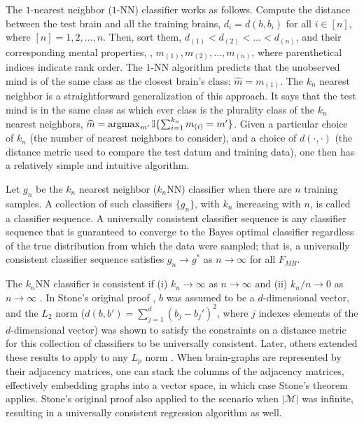\documentclass{article}
\newcommand{\conv}{\rightarrow}
\newcommand{\II}{\mathbb{I}}           %
\providecommand{\mc}[1]{\mathcal{#1}}
\providecommand{\mh}[1]{\widehat{#1}}
\newcommand{\argmax}{\operatornamewithlimits{argmax}}
\begin{document}
The $1$-nearest neighbor ($1$-NN) classifier works as follows.  Compute the distance between the test brain and all the training brains, $d_i=d(b,b_i)$ for all $i \in [n]$, where $[n]=1,2,\ldots, n$.  Then, sort them, $d_{(1)} < d_{(2)} < \ldots < d_{(n)}$, and their corresponding mental properties, , $m_{(1)}, m_{(2)}, \ldots, m_{(n)}$, where parenthetical indices indicate rank order.  %
The $1$-NN algorithm predicts that the unobserved mind is of the same class as the closest brain's class: $\mh{m}=m_{(1)}$.  The $k_n$ nearest neighbor is a straightforward generalization of this approach.  It says that the test mind is in the same class as which ever class is the plurality class of the $k_n$ nearest neighbors, $\mh{m}=\argmax_{m'}\II\{\sum_{i=1}^{k_n} m_{(i)}=m'\}$.  Given a particular choice of $k_n$ (the number of nearest neighbors to consider), and a choice of $d(\cdot,\cdot)$ (the distance metric used to compare the test datum and training data), one then has a relatively simple and intuitive algorithm.  

Let $g_n$ be the $k_n$ nearest neighbor ($k_n$NN) classifier when there are $n$ training samples.  
A collection of such classifiers $\{g_n\}$,  with $k_n$ increasing with $n$, is called a classifier sequence.  
A universally consistent classifier sequence is any classifier sequence that is guaranteed to converge to the Bayes optimal classifier regardless of the true distribution from which the data were sampled; that is, a universally consistent classifier sequence satisfies $g_n \conv g^*$ as $n \conv \infty$ for all $F_{MB}$.

The $k_n$NN classifier is consistent if (i) $k_n \conv \infty$ as $n \conv \infty$ and (ii) $k_n/n \conv 0$ as $n\conv\infty$ \cite{Stone1977}. In Stone's original proof \cite{Stone1977}, $b$ was assumed to be a $d$-dimensional vector, and the $L_2$ norm ($d(b,b')=\sum_{j=1}^d (b_j-b_j')^2$, where $j$ indexes elements of the $d$-dimensional vector) was shown to satisfy the constraints on a distance metric for this collection of classifiers to be universally consistent.  Later, others extended these results to apply to any $L_p$ norm \cite{DGL96}.  When brain-graphs are represented by their adjacency matrices, one can stack the columns of the adjacency matrices, effectively embedding graphs into a vector space, in which case Stone's theorem applies.  Stone's original proof also applied to the scenario when $|\mc{M}|$ was infinite, resulting in a universally consistent regression algorithm as well.
\end{document}
